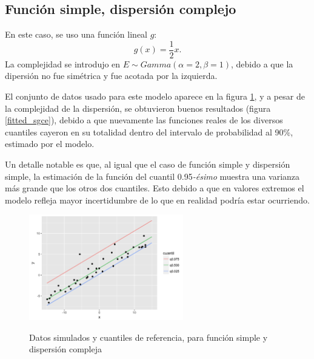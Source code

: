 \subsection{Funci\'on simple, dispersi\'on complejo}

En este caso, se uso una funci\'on lineal $g$:
\begin{equation*}
    g(x) = \frac{1}{2} x.
\end{equation*}
La complejidad se introdujo en $E \sim \textit{Gamma}(\alpha = 2,\beta = 1)$, debido a que la dipersi\'on no fue sim\'etrica y fue acotada por la izquierda. 

El conjunto de datos usado para este modelo aparece en la figura \ref{sample_sgce}, y a pesar de la complejidad de la dispersi\'on, se obtuvieron buenos resultados (figura \ref{fitted_sgce}), debido a que nuevamente las funciones reales de los diversos cuantiles cayeron en su totalidad dentro del intervalo de probabilidad al 90\%, estimado por el modelo.

Un detalle notable es que, al igual que el caso de funci\'on simple y dispersi\'on simple, la estimaci\'on de la funci\'on del cuantil 0.95\textit{-\'esimo} muestra una varianza m\'as grande que los otros dos cuantiles. Esto debido a que en valores extremos el modelo refleja mayor incertidumbre de lo que en realidad podr\'ia estar ocurriendo.

\begin{figure}[H]
	\centering
	\caption{Datos simulados y cuantiles de referencia, para funci\'on simple y dispersi\'on compleja}
	\includegraphics[width=0.60\textwidth]{Figures/Simulation/simple_g_complex_error/sample.png}
	\label{sample_sgce}
\end{figure}

